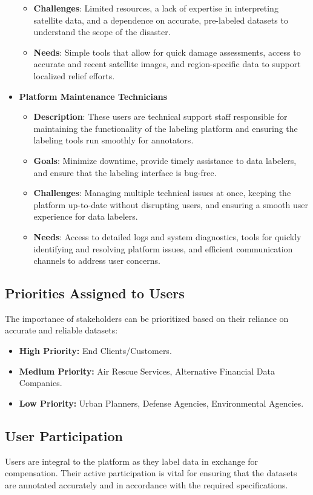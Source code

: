 \documentclass[12pt]{article}
\begin{document}
\begin{itemize}
\begin{itemize}
        \item \textbf{Challenges}: Limited resources, a lack of expertise in interpreting satellite data, and a dependence on accurate, pre-labeled datasets to understand the scope of the disaster.
        \item \textbf{Needs}: Simple tools that allow for quick damage assessments, access to accurate and recent satellite images, and region-specific data to support localized relief efforts.
    \end{itemize}
    \item \textbf{Platform Maintenance Technicians}
    \begin{itemize}
        \item \textbf{Description}: These users are technical support staff responsible for maintaining the functionality of the labeling platform and ensuring the labeling tools run smoothly for annotators.
        \item \textbf{Goals}: Minimize downtime, provide timely assistance to data labelers, and ensure that the labeling interface is bug-free.
        \item \textbf{Challenges}: Managing multiple technical issues at once, keeping the platform up-to-date without disrupting users, and ensuring a smooth user experience for data labelers.
        \item \textbf{Needs}: Access to detailed logs and system diagnostics, tools for quickly identifying and resolving platform issues, and efficient communication channels to address user concerns.
    \end{itemize}
\end{itemize}

\subsection{Priorities Assigned to Users}
The importance of stakeholders can be prioritized based on their reliance on accurate and reliable datasets:
\begin{itemize}
    \item \textbf{High Priority:} End Clients/Customers.
    \item \textbf{Medium Priority:} Air Rescue Services, Alternative Financial Data Companies.
    \item \textbf{Low Priority:} Urban Planners, Defense Agencies, Environmental Agencies.
\end{itemize}

\subsection{User Participation}
Users are integral to the platform as they label data in exchange for compensation. Their active participation is vital for ensuring that the datasets are annotated accurately and in accordance with the required specifications.
\end{document}
